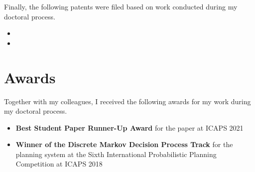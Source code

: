 Finally, the following patents were filed based on work conducted during my doctoral process.

\renewcommand{\citebf}[1]{\textbf{#1}}
\begin{itemize}
    \item {}
    \item {}
\end{itemize}
\renewcommand{\citebf}[1]{#1}

\section{Awards}
Together with my colleagues, I received the following awards for my work during my doctoral process.

\renewcommand{\citebf}[1]{\textbf{#1}}
\begin{itemize}
    \item \textbf{Best Student Paper Runner-Up Award} for the paper  \autocite{speck-et-al-icaps2021} at ICAPS 2021
    \item \textbf{Winner of the Discrete Markov Decision Process Track} for the planning system  \autocite{geisser-speck-ippc2018} at the Sixth International Probabilistic Planning Competition at ICAPS 2018
\end{itemize}
\renewcommand{\citebf}[1]{#1}
